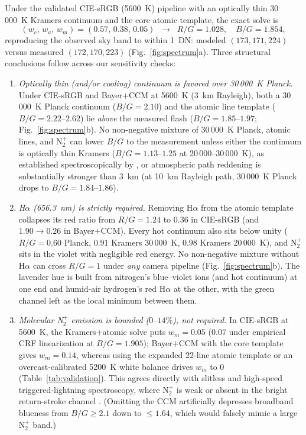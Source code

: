 \documentclass[11pt,a4paper]{article}
\newcommand{\Ntp}{N$_2^+$}
\begin{document}
Under the validated CIE-sRGB (5600~K) pipeline with an optically thin
30\,000~K Kramers continuum and the core atomic template, the exact solve is
\begin{equation}
  (w_c,\,w_a,\,w_m) = (0.57,\,0.38,\,0.05)
  \;\;\longrightarrow\;\;
  R/G = 1.028,\quad B/G = 1.854,
\end{equation}
reproducing the observed sky band to within 1~DN: modeled $(173,171,224)$
versus measured $(172,170,223)$ (Fig.~\ref{fig:spectrum}a). Three structural
conclusions follow across our sensitivity checks:
\begin{enumerate}\itemsep3pt
  \item \emph{Optically thin (and/or cooling) continuum is favored over
  30\,000~K Planck.} Under CIE-sRGB and Bayer$+$CCM at 5600~K (3~km Rayleigh),
  both a 30\,000~K Planck continuum ($B/G=2.10$) and the atomic line template
  ($B/G=2.22$--$2.62$) lie \emph{above} the measured flash ($B/G=1.85$--$1.97$;
  Fig.~\ref{fig:spectrum}b). No non-negative mixture of 30\,000~K Planck,
  atomic lines, and \Ntp{} can lower $B/G$ to the measurement unless either
  the continuum is optically thin Kramers ($B/G=1.13$--$1.25$ at
  20\,000--30\,000~K), as established spectroscopically by \citet{uman1965},
  or atmospheric path reddening is substantially stronger than 3~km (at 10~km
  Rayleigh path, 30\,000~K Planck drops to $B/G=1.84$--$1.86$).

  \item \emph{H$\alpha$ (656.3~nm) is strictly required.} Removing H$\alpha$
  from the atomic template collapses its red ratio from $R/G=1.24$ to $0.36$
  in CIE-sRGB (and $1.90\to 0.26$ in Bayer$+$CCM). Every hot continuum also
  sits below unity ($R/G=0.60$ Planck, $0.91$ Kramers 30\,000~K, $0.98$
  Kramers 20\,000~K), and \Ntp{} sits in the violet with negligible red
  energy. No non-negative mixture without H$\alpha$ can cross $R/G=1$ under
  \emph{any} camera pipeline (Fig.~\ref{fig:spectrum}b). The lavender hue is
  built from nitrogen's blue--violet ions (and hot continuum) at one end and
  humid-air hydrogen's red H$\alpha$ at the other, with the green channel left
  as the local minimum between them.

  \item \emph{Molecular \Ntp{} emission is bounded ($0$--$14\%$), not
  required.} In CIE-sRGB at 5600~K, the Kramers$+$atomic solve puts $w_m=0.05$
  ($0.07$ under empirical CRF linearization at $B/G=1.905$); Bayer$+$CCM with
  the core template gives $w_m=0.14$, whereas using the expanded 22-line
  atomic template or an overcast-calibrated 5200~K white balance drives $w_m$
  to $0$ (Table~\ref{tab:validation}). This agrees directly with slitless and
  high-speed triggered-lightning spectroscopy, where \Ntp{} is weak or absent
  in the bright return-stroke channel \citep{salanave1962,walker2017,walker2019}.
  (Omitting the CCM artificially depresses broadband blueness from $B/G\ge 2.1$
  down to $\le 1.64$, which would falsely mimic a large \Ntp{} band.)
\end{enumerate}
\end{document}
